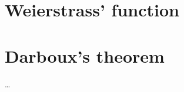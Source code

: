 \documentclass[
	fontsize=10pt, %
	twoside=true, %
	secnumdepth=1, %
	numbers=noenddot, %
]{kaobook}
\begin{document}
\section{Weierstrass' function}

\section{Darboux's theorem}

\dots


\backmatter %







\renewcommand{\nomname}{Notation} %
\renewcommand{\nompreamble}{The next list describes several symbols that will be later used within the body of the document.} %

\printnomenclature %

\end{document}
